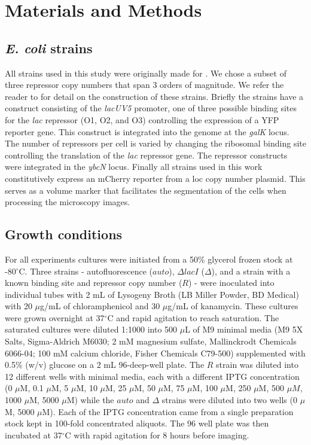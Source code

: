 \section{Materials and Methods}

\subsection{\textit{E. coli} strains}

All strains used in this study were originally made for \cite{Razo-Mejia2018}.
We chose a subset of three repressor copy numbers that span 3 orders of
magnitude. We refer the reader to \cite{Razo-Mejia2018} for detail on the
construction of these strains. Briefly the strains have a construct consisting
of the \textit{lacUV5} promoter, one of three possible binding sites for the
\textit{lac} repressor (O1, O2, and O3) controlling the expression of a YFP
reporter gene. This construct is integrated into the genome at the
\textit{galK} locus. The number of repressors per cell is varied by changing
the ribosomal binding site controlling the translation of the \textit{lac}
repressor gene. The repressor constructs were integrated in the \textit{ybcN}
locus. Finally all strains used in this work constitutively express an mCherry
reporter from a loc copy number plasmid. This serves as a volume marker that
facilitates the segmentation of the cells when processing the microscopy
images.

\subsection{Growth conditions}

For all experiments cultures were initiated from a 50\% glycerol frozen stock
at -80$^\circ$C. Three strains - autofluorescence ($auto$), $\Delta lacI$
($\Delta$), and a strain with a known binding site and repressor copy number
($R$) - were inoculated into individual tubes with 2 mL of Lysogeny Broth (LB
Miller Powder, BD Medical) with 20 $\mu$g/mL of chloramphenicol and 30
$\mu$g/mL of kanamycin. These cultures were grown overnight at 37$^\circ$C and
rapid agitation to reach saturation. The saturated cultures were diluted 1:1000
into 500 $\mu$L of M9 minimal media (M9 5X Salts, Sigma-Aldrich M6030; 2 mM
magnesium sulfate, Mallinckrodt Chemicals 6066-04; 100 mM calcium chloride,
Fisher Chemicals C79-500) supplemented with 0.5\% (w/v) glucose on a 2 mL
96-deep-well plate. The $R$ strain was diluted into 12 different wells with
minimal media, each with a different IPTG  concentration (0 $\mu$M, 0.1 $\mu$M,
5 $\mu$M, 10 $\mu$M, 25 $\mu$M, 50 $\mu$M, 75 $\mu$M, 100 $\mu$M, 250 $\mu$M,
500 $\mu M$, 1000 $\mu$M, 5000 $\mu$M) while  the $auto$ and $\Delta$ strains
were diluted into two wells (0 $\mu$M, 5000 $\mu$M). Each of the IPTG
concentration came from a single preparation stock kept in 100-fold
concentrated aliquots. The 96 well plate was then incubated at 37$^\circ$C with
rapid agitation for 8 hours before imaging.

